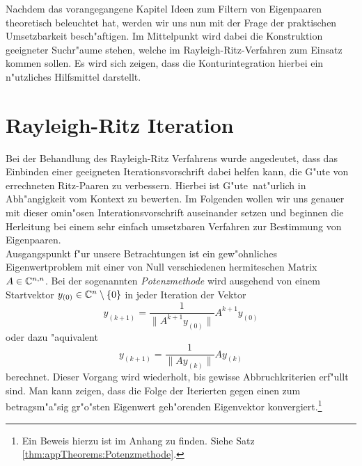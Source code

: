 Nachdem das vorangegangene Kapitel Ideen zum Filtern von Eigenpaaren theoretisch beleuchtet hat, werden wir uns nun mit der Frage der praktischen Umsetzbarkeit besch"aftigen.
Im Mittelpunkt wird dabei die Konstruktion geeigneter Suchr"aume stehen, welche im Rayleigh-Ritz-Verfahren zum Einsatz kommen sollen.
Es wird sich zeigen, dass die Konturintegration hierbei ein n"utzliches Hilfsmittel darstellt.

\section{Rayleigh-Ritz Iteration}\label{chap4:beschrr}



Bei der Behandlung des Rayleigh-Ritz Verfahrens wurde angedeutet, dass das Einbinden einer geeigneten Iterationsvorschrift dabei helfen kann, die G"ute von errechneten Ritz-Paaren zu verbessern.
Hierbei ist \glqq G"ute\grqq\ nat"urlich in Abh"angigkeit vom Kontext zu bewerten. Im Folgenden wollen wir uns genauer mit dieser omin"osen Interationsvorschrift auseinander setzen und beginnen die Herleitung bei einem sehr einfach umsetzbaren Verfahren zur Bestimmung von Eigenpaaren.\\


Ausgangspunkt f"ur unsere Betrachtungen ist ein gew"ohnliches Eigenwertproblem mit einer von Null verschiedenen hermiteschen Matrix $A\in\mathbb{C}^{n,n}$. Bei der sogenannten \emph{Potenzmethode} wird
ausgehend von einem Startvektor $y_{(0)}\in\mathbb{C}^n \setminus\{0\}$ in jeder Iteration der Vektor
\[
y_{(k+1)} = \frac{1}{\|A^{k+1} y_{(0)}\|} A^{k+1}y_{(0)}
\]
oder dazu "aquivalent
\[
y_{(k+1)} = \frac{1}{\|Ay_{(k)}\|} Ay_{(k)}
\]
berechnet. Dieser Vorgang wird wiederholt, bis gewisse Abbruchkriterien erf"ullt sind. Man kann zeigen, dass die Folge der Iterierten gegen einen zum betragsm"a"sig gr"o"sten Eigenwert geh"orenden Eigenvektor konvergiert.\footnote{Ein Beweis hierzu ist im Anhang zu finden. Siehe Satz \ref{thm:appTheorems:Potenzmethode}.}

